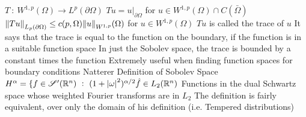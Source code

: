 \documentclass[14pt]{extarticle}
\begin{document}
\begin{outline}
							\4	$T~:~W^{1,p}(\Omega) \rightarrow L^p(\partial \Omega)$
							\4	$Tu = u|_{\partial \Omega}$ for $u \in W^{1,p}(\Omega) \cap C(\bar{\Omega})$
							\4	$\norm{Tu}_{L_p(\partial \Omega)} \le c(p,\Omega) \norm{u}_{W^{1,p}}(\Omega)$ for 
									$u \in W^{1,p}(\Omega)$
						\3	$Tu$ is called the trace of $u$
						\3	It says that the trace is equal to the function on the boundary,
								if the function is in a suitable function space
						\3	In just the Sobolev space, the trace is bounded by a constant
								times the function
						\3	Extremely useful when finding function spaces for boundary conditions
					\2	Natterer Definition of Sobolev Space
						\3	$H^{\alpha} = \{f \in \mathscr{S}'(\mathbb{R}^n)~:~
									(1 + \abs{\omega}^2)^{\alpha/2} \hat{f} \in L_2(\mathbb{R}^n)$
						\3	Functions in the dual Schwartz space whose weighted Fourier 
								transforms are in $L_2$
						\3	The definition is fairly equivalent, over only the domain of
								his definition (i.e. Tempered distributions)
	\end{outline}
\end{document}
